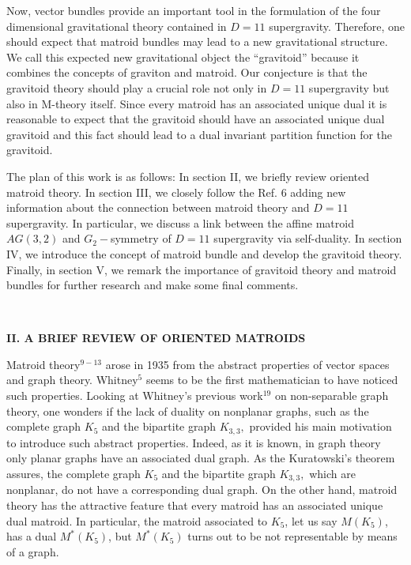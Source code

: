 \documentclass[a4paper,12pt]{article}
\begin{document}
Now, vector bundles provide an important tool in the formulation of the four
dimensional gravitational theory contained in $D=11$ supergravity.
Therefore, one should expect that matroid bundles may lead to a new
gravitational structure. We call this expected new gravitational object the
``gravitoid'' because it combines the concepts of graviton and matroid. Our
conjecture is that the gravitoid theory should play a crucial role not only
in $D=11$ supergravity but also in M-theory itself. Since every matroid has
an associated unique dual it is reasonable to expect that the gravitoid
should have an associated unique dual gravitoid and this fact should lead to
a dual invariant partition function for the gravitoid.

The plan of this work is as follows: In section II, we briefly review
oriented matroid theory. In section III, we closely follow the Ref. 6 adding
new information about the connection between matroid theory and $D=11$
supergravity. In particular, we discuss a link between the affine matroid $%
AG(3,2)$ and $G_{2}-$symmetry of $D=11$ supergravity via self-duality. In
section IV, we introduce the concept of matroid bundle and develop the
gravitoid theory. Finally, in section V, we remark the importance of
gravitoid theory and matroid bundles for further research and make some
final comments.

\bigskip

\smallskip\ 

\noindent \textbf{II. A BRIEF REVIEW OF ORIENTED MATROIDS}

\bigskip

Matroid theory$^{9-13}$ arose in 1935 from the abstract properties of vector
spaces and graph theory. Whitney$^{5}$ seems to be the first mathematician
to have noticed such properties. Looking at Whitney's previous work$^{19}$
on non-separable graph theory, one wonders if the lack of duality on
nonplanar graphs, such as the complete graph $K_{5}$ and the bipartite graph 
$K_{3,3},$ provided his main motivation to introduce such abstract
properties. Indeed, as it is known, in graph theory only planar graphs have
an associated dual graph. As the Kuratowski's theorem assures, the complete
graph $K_{5}$ and the bipartite graph $K_{3,3},$ which are nonplanar, do not
have a corresponding dual graph. On the other hand, matroid theory has the
attractive feature that every matroid has an associated unique dual matroid.
In particular, the matroid associated to $K_{5}$, let us say $M(K_{5})$, has
a dual $M^{\ast }(K_{5})$, but $M^{\ast }(K_{5})$ turns out to be not
representable by means of a graph.
\end{document}
